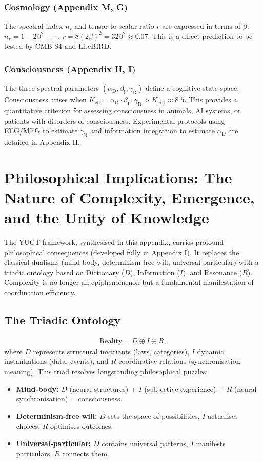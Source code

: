 \documentclass[11pt]{article}
\theoremstyle{remark}
\newcommand{\Keff}{K_{\mathrm{eff}}}
\newcommand{\Kcrit}{K_{\mathrm{crit}}}
\newcommand{\alD}{\alpha_{\mathrm{D}}}
\newcommand{\beI}{\beta_{\mathrm{I}}}
\newcommand{\gaR}{\gamma_{\mathrm{R}}}
\begin{document}
	\subsubsection{Cosmology (Appendix M, G)}
	The spectral index $n_s$ and tensor‑to‑scalar ratio $r$ are expressed in terms of $\beta$: $n_s = 1 - 2\beta^2 + \cdots$, $r = 8(2\beta)^2 = 32\beta^2 \approx 0.07$. This is a direct prediction to be tested by CMB‑S4 and LiteBIRD.
	
	\subsubsection{Consciousness (Appendix H, I)}
	The three spectral parameters $(\alD, \beI, \gaR)$ define a cognitive state space. Consciousness arises when $\Keff = \alD \cdot \beI \cdot \gaR > \Kcrit \approx 8.5$. This provides a quantitative criterion for assessing consciousness in animals, AI systems, or patients with disorders of consciousness. Experimental protocols using EEG/MEG to estimate $\gaR$ and information integration to estimate $\alD$ are detailed in Appendix H.
	
	\section{Philosophical Implications: The Nature of Complexity, Emergence, and the Unity of Knowledge}
	\label{sec:philosophy}
	
	The YUCT framework, synthesised in this appendix, carries profound philosophical consequences (developed fully in Appendix I). It replaces the classical dualisms (mind‑body, determinism‑free will, universal‑particular) with a triadic ontology based on Dictionary ($D$), Information ($I$), and Resonance ($R$). Complexity is no longer an epiphenomenon but a fundamental manifestation of coordination efficiency.
	
	\subsection{The Triadic Ontology}
	\begin{align*}
		\text{Reality} = D \oplus I \oplus R,
	\end{align*}
	where $D$ represents structural invariants (laws, categories), $I$ dynamic instantiations (data, events), and $R$ coordinative relations (synchronisation, meaning). This triad resolves longstanding philosophical puzzles:
	\begin{itemize}
		\item \textbf{Mind‑body:} $D$ (neural structures) + $I$ (subjective experience) + $R$ (neural synchronisation) = consciousness.
		\item \textbf{Determinism‑free will:} $D$ sets the space of possibilities, $I$ actualises choices, $R$ optimises outcomes.
		\item \textbf{Universal‑particular:} $D$ contains universal patterns, $I$ manifests particulars, $R$ connects them.
	\end{itemize}
	
\end{document}

